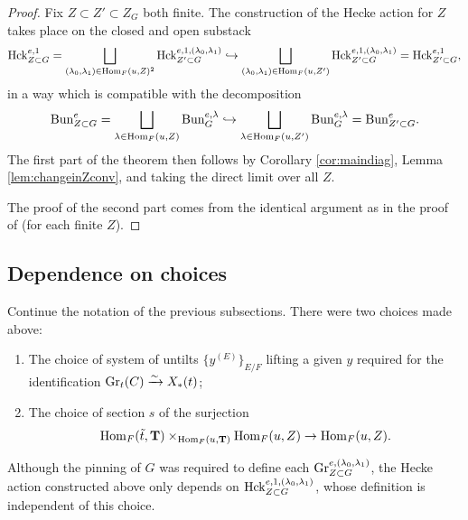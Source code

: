 \begin{proof}
     Fix $Z \subset Z' \subset Z_{G}$ both finite. The construction of the Hecke action for $Z$ takes place on the closed and open substack
     \begin{equation*}
\mathrm{Hck}_{Z \subset G}^{e,1} = \bigsqcup_{(\lambda_{0},\lambda_{1}) \in \mathrm{Hom}_{F}(u,Z)^{2}} \mathrm{Hck}_{Z' \subset G}^{e,1,(\lambda_{0},\lambda_{1})} \hookrightarrow  \bigsqcup_{(\lambda_{0},\lambda_{1}) \in \mathrm{Hom}_{F}(u,Z')} \mathrm{Hck}_{Z' \subset G}^{e,1,(\lambda_{0},\lambda_{1})} = \mathrm{Hck}_{Z' \subset G}^{e,1},
     \end{equation*}
     in a way which is compatible with the decomposition 
     \begin{equation*}
\mathrm{Bun}_{Z \subset G}^{e} = \bigsqcup_{\lambda \in \mathrm{Hom}_{F}(u,Z)} \mathrm{Bun}_{G}^{e,\lambda} \hookrightarrow \bigsqcup_{\lambda \in \mathrm{Hom}_{F}(u,Z')} \mathrm{Bun}_{G}^{e,\lambda} = \mathrm{Bun}_{Z' \subset G}^{e}.
     \end{equation*}
     The first part of the theorem then follows by Corollary \ref{cor:maindiag}, Lemma \ref{lem:changeinZconv}, and taking the direct limit over all $Z$.

     The proof of the second part comes from the identical argument as in the proof of \cite[Theorem IX.2.2]{Geometrization} (for each finite $Z$).
 \end{proof}

 \subsection{Dependence on choices}
Continue the notation of the previous subsections. There were two choices made above: 
\begin{enumerate}
\item{The choice of system of untilts $\{y^{(E)}\}_{E/F}$ lifting a given $y$ required for the identification $\textnormal{Gr}_{t}(C) \xrightarrow{\sim} X_{*}(t)$;}
\item{The choice of section $s$ of the surjection
\begin{equation}\label{eq:sectionsurj}
     \mathrm{Hom}_{F}(\tilde{t}, \mathbf{T}) \times_{\mathrm{Hom}_{F}(u,\mathbf{T})} \mathrm{Hom}_{F}(u,Z) \to \mathrm{Hom}_{F}(u,Z).
 \end{equation}
}
\end{enumerate}

\begin{rque}
    Although the pinning of $G$ was required to define each $\textnormal{Gr}_{Z \subset G}^{e,(\lambda_{0},\lambda_{1})}$, the Hecke action constructed above only depends on $\mathrm{Hck}_{Z \subset G}^{e,1,(\lambda_{0},\lambda_{1})}$, whose definition is independent of this choice.
\end{rque}

